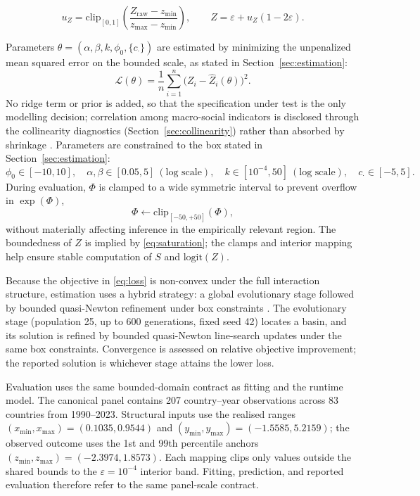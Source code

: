 \documentclass[11pt]{article}
\begin{document}
\begin{equation}
\label{eq:z_map}
u_Z=\mathrm{clip}_{[0,1]}\!\left(\frac{Z_{\mathrm{raw}}-z_{\min}}{z_{\max}-z_{\min}}\right),\qquad
Z=\varepsilon+u_Z(1-2\varepsilon).
\end{equation}

Parameters $\theta=(\alpha,\beta,k,\phi_0,\{c_\cdot\})$ are estimated by minimizing the unpenalized mean squared error on the bounded scale, as stated in Section~\ref{sec:estimation}:
\begin{equation}
\label{eq:loss}
\mathcal{L}(\theta)=\frac{1}{n}\sum_{i=1}^{n}\bigl(Z_i-\widehat{Z}_i(\theta)\bigr)^2 .
\end{equation}
No ridge term or prior is added, so that the specification under test is the only modelling decision; correlation among macro-social indicators is disclosed through the collinearity diagnostics (Section~\ref{sec:collinearity}) rather than absorbed by shrinkage \parencite{Hastie2009ESL,Greene2018Econometric}. Parameters are constrained to the box stated in Section~\ref{sec:estimation}:
\[
\phi_0\in[-10,10],\quad \alpha,\beta\in[0.05,5]\ (\text{log scale}),\quad k\in[10^{-4},50]\ (\text{log scale}),\quad c_\cdot\in[-5,5].
\]
During evaluation, $\Phi$ is clamped to a wide symmetric interval to prevent overflow in $\exp(\Phi)$,
\begin{equation}
\label{eq:phi_clamp}
\Phi \leftarrow \mathrm{clip}_{[-50,+50]}(\Phi),
\end{equation}
without materially affecting inference in the empirically relevant region. The boundedness of $Z$ is implied by \eqref{eq:saturation}; the clamps and interior mapping help ensure stable computation of $S$ and $\mathrm{logit}(Z)$.

Because the objective in \eqref{eq:loss} is non-convex under the full interaction structure, estimation uses a hybrid strategy: a global evolutionary stage followed by bounded quasi-Newton refinement under box constraints \parencite{StornPrice1997,NocedalWright2006}. The evolutionary stage (population 25, up to 600 generations, fixed seed 42) locates a basin, and its solution is refined by bounded quasi-Newton line-search updates under the same box constraints. Convergence is assessed on relative objective improvement; the reported solution is whichever stage attains the lower loss.

Evaluation uses the same bounded-domain contract as fitting and the runtime model. The canonical panel contains 207 country--year observations across 83 countries from 1990--2023. Structural inputs use the realised ranges $(x_{\min},x_{\max})=(0.1035,0.9544)$ and $(y_{\min},y_{\max})=(-1.5585,5.2159)$; the observed outcome uses the 1st and 99th percentile anchors $(z_{\min},z_{\max})=(-2.3974,1.8573)$. Each mapping clips only values outside the shared bounds to the $\varepsilon=10^{-4}$ interior band. Fitting, prediction, and reported evaluation therefore refer to the same panel-scale contract.
\end{document}
